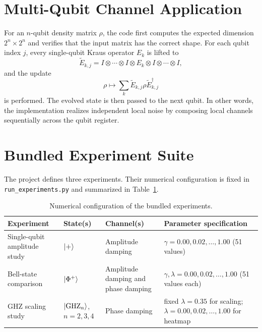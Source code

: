 \section{Multi-Qubit Channel Application}

For an $n$-qubit density matrix $\rho$, the code first computes the expected dimension $2^n \times 2^n$ and verifies that the input matrix has the correct shape. For each qubit index $j$, every single-qubit Kraus operator $E_k$ is lifted to
\begin{equation}
\widetilde{E}_{k,j} = I \otimes \cdots \otimes I \otimes E_k \otimes I \otimes \cdots \otimes I,
\label{eq:lifted_kraus}
\end{equation}
and the update
\begin{equation}
\rho \mapsto \sum_k \widetilde{E}_{k,j} \rho \widetilde{E}_{k,j}^\dagger
\end{equation}
is performed. The evolved state is then passed to the next qubit. In other words, the implementation realizes independent local noise by composing local channels sequentially across the qubit register.

\section{Bundled Experiment Suite}

The project defines three experiments. Their numerical configuration is fixed in \texttt{run\_experiments.py} and summarized in Table~\ref{tab:experiments}.

\begin{table}[t]
\centering
\caption{Numerical configuration of the bundled experiments.}
\label{tab:experiments}
\begin{tabular}{p{3.2cm} p{2.3cm} p{3.2cm} p{5.1cm}}
\toprule
Experiment & State(s) & Channel(s) & Parameter specification \\
\midrule
Single-qubit amplitude study & $\lvert + \rangle$ & Amplitude damping & $\gamma = 0.00, 0.02, \dots, 1.00$ (51 values) \\
Bell-state comparison & $\lvert \Phi^+ \rangle$ & Amplitude damping and phase damping & $\gamma, \lambda = 0.00, 0.02, \dots, 1.00$ (51 values each) \\
GHZ scaling study & $\lvert \mathrm{GHZ}_n \rangle$, $n=2,3,4$ & Phase damping & fixed $\lambda = 0.35$ for scaling; $\lambda = 0.00, 0.02, \dots, 1.00$ for heatmap \\
\bottomrule
\end{tabular}
\end{table}

